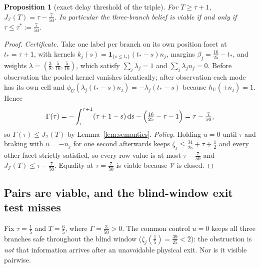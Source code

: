 \documentclass[11pt,a4paper]{article}
\theoremstyle{plain}
\newtheorem{proposition}[theorem]{Proposition}
\theoremstyle{definition}
\theoremstyle{remark}
\newcommand{\calI}{\mathcal{I}}
\newcommand{\calV}{\mathcal{V}}
\newcommand{\J}{J_{\calI}(T)}
\newcommand{\tfr}[2]{\tfrac{#1}{#2}}
\newcommand{\dd}{\,\mathrm{d}}
\begin{document}
\begin{proposition}[exact delay threshold of the triple]\label{prop:triple}
For $T\ge\tau+1$, $\J=\tau-\tfr7{50}$. In particular the three-branch belief is viable if and only if $\tau\le\tau^\ast:=\tfr7{50}$.
\end{proposition}

\begin{proof}
\emph{Certificate.} Take one label per branch on its own position facet at $t_\ast=\tau+1$, with kernels $k_j(s)=\mathbf 1_{\{s\le t_\ast\}}(t_\ast-s)n_j$, margins $\beta_j=\tfr{16}{25}-t_\ast$, and weights $\lambda=(\tfr38,\tfr5{16},\tfr5{16})$, which satisfy $\sum_j\lambda_j=1$ and $\sum_j\lambda_jn_j=0$. Before observation the pooled kernel vanishes identically; after observation each mode has its own cell and $\phi_U(\lambda_j(t_\ast-s)n_j)=-\lambda_j(t_\ast-s)$ because $h_U(\pm n_j)=1$. Hence
\begin{equation}\label{eq:gamma-tau}
\Gamma(\tau)=-\int_\tau^{\tau+1}(\tau+1-s)\dd s-\Bigl(\tfr{16}{25}-\tau-1\Bigr)=\tau-\tfr7{50},
\end{equation}
so $\Gamma(\tau)\le\J$ by Lemma~\ref{lem:semantics}. \emph{Policy.} Holding $u=0$ until $\tau$ and braking with $u=-n_j$ for one second afterwards keeps $\zeta_j\le\tfr{34}{25}+\tau+\tfr12$ and every other facet strictly satisfied, so every row value is at most $\tau-\tfr7{50}$ and $\J\le\tau-\tfr7{50}$. Equality at $\tau=\tfr7{50}$ is viable because $\calV$ is closed.
\end{proof}

\subsection{Pairs are viable, and the blind-window exit test misses}

Fix $\tau=\tfr15$ and $T=\tfr65$, where $\Gamma=\tfr3{50}>0$. The common control $u=0$ keeps all three branches safe throughout the blind window ($\zeta_j(\tfr15)=\tfr{39}{25}<2$): the obstruction is \emph{not} that information arrives after an unavoidable physical exit. Nor is it visible pairwise.
\end{document}
